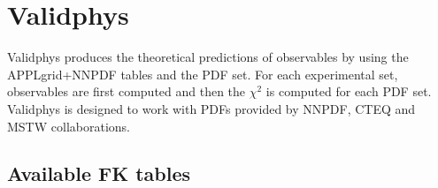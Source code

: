 

\section{Validphys}

Validphys produces the theoretical predictions of observables by using
the APPLgrid+NNPDF tables and the PDF set. For each experimental set,
observables are first computed and then the $\chi^{2}$ is computed
for each PDF set. Validphys is designed to work with PDFs provided
by NNPDF, CTEQ and MSTW collaborations. 


\subsection{Available FK tables}

